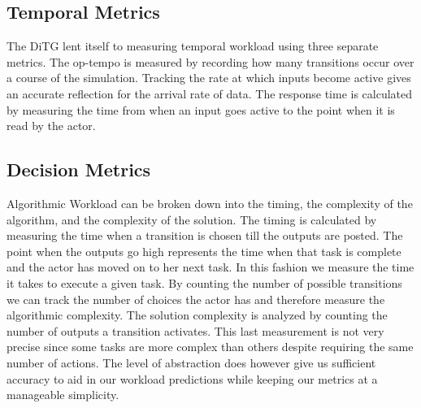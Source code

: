 \subsection{Temporal Metrics}
The DiTG lent itself to measuring temporal workload using three separate metrics. The op-tempo is measured by recording how many transitions occur over a course of the simulation. Tracking the rate at which inputs become active gives an accurate reflection for the arrival rate of data. The response time is calculated by measuring the time from when an input goes active to the point when it is read by the actor.

\subsection{Decision Metrics}
Algorithmic Workload can be broken down into the timing, the complexity of the algorithm, and the complexity of the solution. The timing is calculated by measuring the time when a transition is chosen till the outputs are posted. The point when the outputs go high represents the time when that task is complete and the actor has moved on to her next task. In this fashion we measure the time it takes to execute a given task. By counting the number of possible transitions we can track the number of choices the actor has and therefore measure the algorithmic complexity. The solution complexity is analyzed by counting the number of outputs a transition activates. This last measurement is not very precise since some tasks are more complex than others despite requiring the same number of actions. The level of abstraction does however give us sufficient accuracy to aid in our workload predictions while keeping our metrics at a manageable simplicity.
